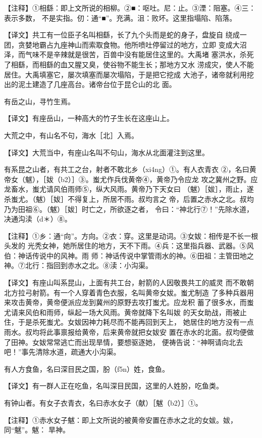 \documentclass[a4paper,12pt,UTF8,twoside]{ctexbook}
\begin{document}
【注释】①相繇：即上文所说的相柳。②■：呕吐。尼：止。③湮：阻塞。④三：表示多数， 不是实指。仞：通“■”。充满。沮：败坏。这里指塌陷、陷落。

【译文】共工有一位臣子名叫相繇，长了九个头而是蛇的身子，盘旋自 绕成一团，贪婪地霸占九座神山而索取食物。他所喷吐停留过的地方，立即 变成大沼泽，而气味不是辛辣就是很苦，百兽中没有能居住这里的。大禹堵 塞洪水，杀死了相繇，而相繇的血又腥又臭，使谷物不能生长；那地方又水 涝成灾，使人不能居住。大禹填塞它，屡次填塞而屡次塌陷，于是把它挖成 大池子，诸帝就利用挖出的泥土建造了几座高台。诸帝台位于昆仑山的北 面。

有岳之山，寻竹生焉。

【译文】有座岳山，一种高大的竹子生长在这座山上。

大荒之中，有山名不句，海水［北］入焉。

【译文】大荒当中，有座山名叫不句山，海水从北面灌注到这里。

有系昆之山者，有共工之台，射者不敢北乡（xi4ng）①。有人衣青衣 ②，名曰黄帝女（魃），［妭（b2）］③。蚩尤作兵伐黄帝④，黄帝乃令应龙 攻之冀州之野。应龙畜水，蚩尤请风伯雨师⑤，纵大风雨。黄帝乃下天女曰 （魃）［妭］，雨止，遂杀蚩尤。（魃）［妭］不得复上，所居不雨。叔均言之 帝，后置之赤水之北。叔均乃为田祖⑥。（魃）［妭］时亡之，所欲逐之者， 令曰：“神北行⑦！”先除水道，决通沟渎（d＊）⑧。

【注释】①乡：通“向”。方向。②衣：穿。这里是动词。③女妭：相传是不长一根头发的 光秃女神，她所居住的地方，天不下雨。④兵：这里指兵器、武器。⑤风伯：神话传说中的风神。雨 师：神话传说中掌管雨水的神。⑥田祖：主管田地之神。⑦北行：指回到赤水之北。⑧渎：小沟渠。

【译文】有座山叫系昆山，上面有共工台，射箭的人因敬畏共工的威灵 而不敢朝北方拉弓射箭。有一个人穿着青色衣服，名叫黄帝女妭。蚩尤制造 了多种兵器用来攻击黄帝，黄帝便派应龙到冀州的原野去攻打蚩尤。应龙积 蓄了很多水，而蚩尤请来风伯和雨师，纵起一场大风雨。黄帝就降下名叫妭 的天女助战，雨被止住，于是杀死蚩尤。女妭因神力耗尽而不能再回到天上， 她居住的地方没有一点雨水。叔均将此事禀报给黄帝，后来黄帝就把女妭安 置在赤水的北面。叔均便做了田神。女妭常常逃亡而出现旱情，要想驱逐她， 便祷告说：“神啊请向北去吧！”事先清除水道，疏通大小沟渠。

有人方食鱼，名曰深目民之国，朌（f5n）姓，食鱼。

【译文】有一群人正在吃鱼，名叫深目民国，这里的人姓朌，吃鱼类。

有钟山者。有女子衣青衣，名曰赤水女子（献）［魃（b2）］①。

【注释】①赤水女子魃：即上文所说的被黄帝安置在赤水之北的女妭。妭，同“魃”。魃： 旱神。
\end{document}
